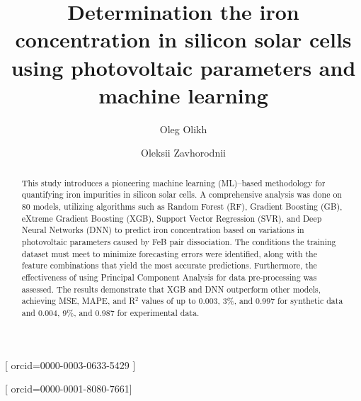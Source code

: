 \documentclass[a4paper,fleqn]{cas-sc}
\begin{document}
\let\WriteBookmarks\relax
\def\floatpagepagefraction{1}
\def\textpagefraction{.001}





\title [mode = title]{Determination the iron concentration in silicon solar cells
using photovoltaic parameters and machine learning}



\author{Oleg Olikh}[
       orcid=0000-0003-0633-5429
       ]

\cormark[1]






\author{Oleksii Zavhorodnii}[
       orcid=0000-0001-8080-7661]




\begin{abstract}
This study introduces a pioneering machine learning (ML)--based methodology for quantifying iron impurities in silicon solar cells.
A comprehensive analysis was done on 80 models, utilizing algorithms such as Random Forest (RF), Gradient Boosting (GB),
eXtreme Gradient Boosting (XGB), Support Vector Regression (SVR), and Deep Neural Networks (DNN)
to predict iron concentration based on variations in photovoltaic parameters caused by FeB pair dissociation.
The conditions the training dataset must meet to minimize forecasting errors were identified,
along with the feature combinations that yield the most accurate predictions.
Furthermore, the effectiveness of using Principal Component Analysis for data pre-processing was assessed.
The results demonstrate that XGB and DNN outperform other models, achieving MSE, MAPE, and R$^2$ values
of up to 0.003, 3\%, and 0.997 for synthetic data and 0.004, 9\%, and 0.987 for experimental data.
\end{abstract}
\end{document}

